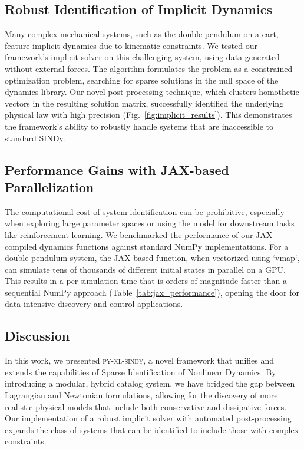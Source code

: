 \documentclass[12pt]{article}
\newcommand{\frameworkname}{\textsc{py-xl-sindy}}
\begin{document}
\subsection*{Robust Identification of Implicit Dynamics}
Many complex mechanical systems, such as the double pendulum on a cart, feature implicit dynamics due to kinematic constraints. We tested our framework's implicit solver on this challenging system, using data generated without external forces. The algorithm formulates the problem as a constrained optimization problem, searching for sparse solutions in the null space of the dynamics library. Our novel post-processing technique, which clusters homothetic vectors in the resulting solution matrix, successfully identified the underlying physical law with high precision (Fig.~\ref{fig:implicit_results}). This demonstrates the framework's ability to robustly handle systems that are inaccessible to standard SINDy.

\subsection*{Performance Gains with JAX-based Parallelization}
The computational cost of system identification can be prohibitive, especially when exploring large parameter spaces or using the model for downstream tasks like reinforcement learning. We benchmarked the performance of our JAX-compiled dynamics functions against standard NumPy implementations. For a double pendulum system, the JAX-based function, when vectorized using `vmap`, can simulate tens of thousands of different initial states in parallel on a GPU. This results in a per-simulation time that is orders of magnitude faster than a sequential NumPy approach (Table~\ref{tab:jax_performance}), opening the door for data-intensive discovery and control applications.

\subsection*{Discussion}
In this work, we presented \frameworkname, a novel framework that unifies and extends the capabilities of Sparse Identification of Nonlinear Dynamics. By introducing a modular, hybrid catalog system, we have bridged the gap between Lagrangian and Newtonian formulations, allowing for the discovery of more realistic physical models that include both conservative and dissipative forces. Our implementation of a robust implicit solver with automated post-processing expands the class of systems that can be identified to include those with complex constraints.
\end{document}
